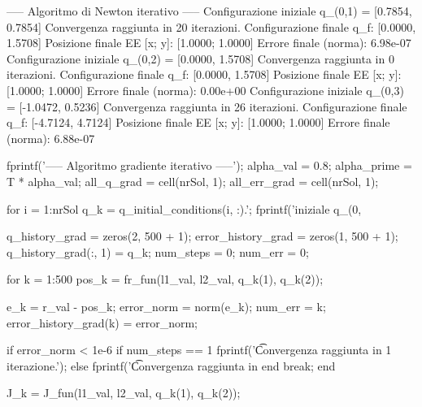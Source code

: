 \documentclass[11pt, a4paper]{article}
\begin{document}
\begin{matlaboutput}
----- Algoritmo di Newton iterativo -----
Configurazione iniziale q_(0,1) = [0.7854, 0.7854]
	 Convergenza raggiunta in 20 iterazioni.
	 Configurazione finale q_f: [0.0000, 1.5708]
	 Posizione finale EE [x; y]: [1.0000; 1.0000]
	 Errore finale (norma): 6.98e-07
Configurazione iniziale q_(0,2) = [0.0000, 1.5708]
	 Convergenza raggiunta in 0 iterazioni.
	 Configurazione finale q_f: [0.0000, 1.5708]
	 Posizione finale EE [x; y]: [1.0000; 1.0000]
	 Errore finale (norma): 0.00e+00
Configurazione iniziale q_(0,3) = [-1.0472, 0.5236]
	 Convergenza raggiunta in 26 iterazioni.
	 Configurazione finale q_f: [-4.7124, 4.7124]
	 Posizione finale EE [x; y]: [1.0000; 1.0000]
	 Errore finale (norma): 6.88e-07
\end{matlaboutput}

\begin{matlabcode}
fprintf('----- Algoritmo gradiente iterativo -----');
alpha_val = 0.8;
alpha_prime = T * alpha_val;
all_q_grad = cell(nrSol, 1);
all_err_grad = cell(nrSol, 1);

for i = 1:nrSol
    q_k = q_initial_conditions(i, :).'; %
    fprintf('\nConfigurazione iniziale q_(0,%

    q_history_grad = zeros(2, 500 + 1);
    error_history_grad = zeros(1, 500 + 1);
    q_history_grad(:, 1) = q_k;
    num_steps = 0;
    num_err = 0;

    for k = 1:500
        pos_k = fr_fun(l1_val, l2_val, q_k(1), q_k(2));

        e_k = r_val - pos_k;
        error_norm = norm(e_k);
        num_err = k;
        error_history_grad(k) = error_norm;

        if error_norm < 1e-6
            if num_steps == 1
                fprintf('\t Convergenza raggiunta in 1 iterazione.\n');
            else
                fprintf('\t Convergenza raggiunta in %
            end
            break;
        end

        J_k = J_fun(l1_val, l2_val, q_k(1), q_k(2));
\end{matlabcode}
\end{document}
